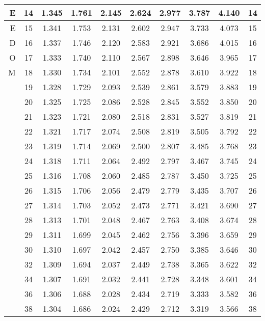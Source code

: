 \documentclass[12 pt, letterpaper]{letter}
\begin{document}
\begin{table}[h]
\begin{center}
\begin{tabular}{|r|c|c|c|c|c|c|c|c|c|}
\hline E  &14 &   1.345 &  1.761 &  2.145 &  2.624 &  2.977 &  3.787 &  4.140 &  14  \\ 
\hline E  &15 &   1.341 &  1.753 &  2.131 &  2.602 &  2.947 &  3.733 &  4.073 &  15 \\ 
\hline D  &16 &   1.337 &  1.746 &  2.120 &  2.583 &  2.921 &  3.686 &  4.015 &  16 \\ 
\hline O  &17 &   1.333 &  1.740 &  2.110 &  2.567 &  2.898 &  3.646 &  3.965 &  17  \\ 
\hline M  &18 &   1.330 &  1.734 &  2.101 &  2.552 &  2.878 &  3.610 &  3.922 &  18  \\ 
\hline    &19 &   1.328 &  1.729 &  2.093 &  2.539 &  2.861 &  3.579 &  3.883 &  19  \\ 
\hline    &20 &   1.325 &  1.725 &  2.086 &  2.528 &  2.845 &  3.552 &  3.850 &  20  \\ 
\hline    &21 &   1.323 &  1.721 &  2.080 &  2.518 &  2.831 &  3.527 &  3.819 &  21  \\ 
\hline    &22 &   1.321 &  1.717 &  2.074 &  2.508 &  2.819 &  3.505 &  3.792 &  22  \\
\hline    &23 &   1.319 &  1.714 &  2.069 &  2.500 &  2.807 &  3.485 &  3.768 &  23  \\
\hline    &24 &   1.318 &  1.711 &  2.064 &  2.492 &  2.797 &  3.467 &  3.745 &  24  \\
\hline    &25 &   1.316 &  1.708 &  2.060 &  2.485 &  2.787 &  3.450 &  3.725 &  25  \\
\hline    &26 &   1.315 &  1.706 &  2.056 &  2.479 &  2.779 &  3.435 &  3.707 &  26  \\
\hline    &27 &   1.314 &  1.703 &  2.052 &  2.473 &  2.771 &  3.421 &  3.690 &  27  \\
\hline    &28 &   1.313 &  1.701 &  2.048 &  2.467 &  2.763 &  3.408 &  3.674 &  28  \\
\hline    &29 &   1.311 &  1.699 &  2.045 &  2.462 &  2.756 &  3.396 &  3.659 &  29  \\
\hline    &30 &   1.310 &  1.697 &  2.042 &  2.457 &  2.750 &  3.385 &  3.646 &  30  \\
\hline    &32 &   1.309 &  1.694 &  2.037 &  2.449 &  2.738 &  3.365 &  3.622 &  32  \\
\hline    &34 &   1.307 &  1.691 &  2.032 &  2.441 &  2.728 &  3.348 &  3.601 &  34 \\
\hline    &36 &   1.306 &  1.688 &  2.028 &  2.434 &  2.719 &  3.333 &  3.582 &  36  \\
\hline    &38 &   1.304 &  1.686 &  2.024 &  2.429 &  2.712 &  3.319 &  3.566 &  38 \\

\end{tabular}
\end{center}
\end{table}
\end{document}

